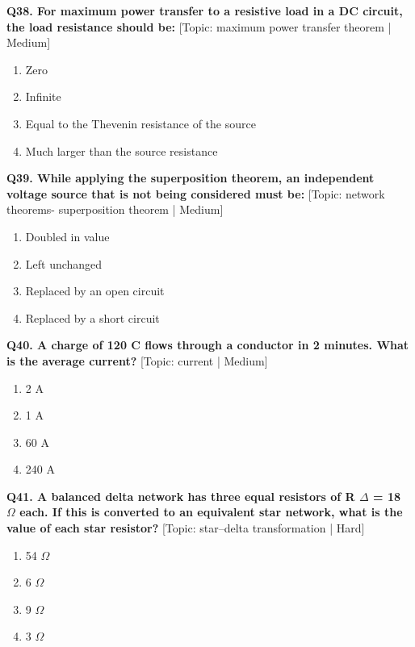 \noindent\textbf{Q38. For maximum power transfer to a resistive load in a DC circuit, the load resistance should be:} \hfill [Topic: maximum power transfer theorem | Medium]
\begin{enumerate}[label=(\alph*),topsep=2pt,itemsep=1pt,partopsep=0pt,parsep=0pt]
    \item {Zero}
    \item {Infinite}
    \item {Equal to the Thevenin resistance of the source}
    \item {Much larger than the source resistance}
\end{enumerate}
\vspace{2mm}

\noindent\textbf{Q39. While applying the superposition theorem, an independent voltage source that is not being considered must be:} \hfill [Topic: network theorems- superposition theorem | Medium]
\begin{enumerate}[label=(\alph*),topsep=2pt,itemsep=1pt,partopsep=0pt,parsep=0pt]
    \item {Doubled in value}
    \item {Left unchanged}
    \item {Replaced by an open circuit}
    \item {Replaced by a short circuit}
\end{enumerate}
\vspace{2mm}

\noindent\textbf{Q40. A charge of 120 C flows through a conductor in 2 minutes. What is the average current?} \hfill [Topic: current | Medium]
\begin{enumerate}[label=(\alph*),topsep=2pt,itemsep=1pt,partopsep=0pt,parsep=0pt]
    \item {2 A}
    \item {1 A}
    \item {60 A}
    \item {240 A}
\end{enumerate}
\vspace{2mm}

\noindent\textbf{Q41. A balanced delta network has three equal resistors of R $\Delta$ = 18 $\Omega$ each. If this is converted to an equivalent star network, what is the value of each star resistor?} \hfill [Topic: star--delta transformation | Hard]
\begin{enumerate}[label=(\alph*),topsep=2pt,itemsep=1pt,partopsep=0pt,parsep=0pt]
    \item {54 $\Omega$}
    \item {6 $\Omega$}
    \item {9 $\Omega$}
    \item {3 $\Omega$}
\end{enumerate}
\vspace{2mm}

